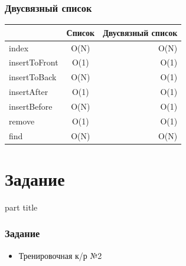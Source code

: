 \documentclass[14pt,pdf,hyperref={unicode}]{beamer}
\begin{document}
\begin{frame}[fragile]
\frametitle{Двусвязный список}
\begin{center}
  \begin{tabular}{  l | c r }
      & Список & Двусвязный список \\
    \hline
    index & O(N) &  O(N) \\
    insertToFront & O(1) & O(1) \\
    insertToBack & O(N) & O(1) \\
    insertAfter & O(1) & O(1) \\
    insertBefore & O(N) & O(1) \\
    remove & O(1) & O(1) \\
    find & O(N) & O(N) \\
    \hline
  \end{tabular}
\end{center}
\end{frame}







\section{Задание}
\begin{frame}
\begin{center}
\begin{beamercolorbox}[sep=8pt,center]{part
title}
\insertsection
\end{beamercolorbox}
\end{center}
\end{frame}

\begin{frame}[fragile]
\frametitle{Задание} 
\begin{itemize}
\item Тренировочная к/р №2
\end{itemize}
\end{frame}
\end{document}
